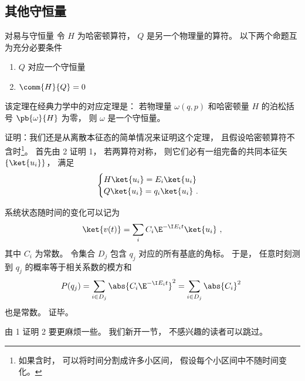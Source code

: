 \subsection{其他守恒量}


\begin{theorem}{对易与守恒量}
令 $H$ 为哈密顿算符， $Q$ 是另一个物理量的算符。 以下两个命题互为充分必要条件
\begin{enumerate}
\item $Q$ 对应一个守恒量
\item $\comm{H}{Q} = 0$
\end{enumerate}
\end{theorem}

该定理在经典力学中的对应定理是： 若物理量 $\omega(q, p)$ 和哈密顿量 $H$ 的泊松括号 $\pb{\omega}{H}$ 为零， 则 $\omega$ 是一个守恒量。

证明：我们还是从离散本征态的简单情况来证明这个定理， 且假设哈密顿算符不含时\footnote{如果含时， 可以将时间分割成许多小区间， 假设每个小区间中不随时间变化。}。 首先由 2 证明 1， 若两算符对称， 则它们必有一组完备的共同本征矢 $\{\ket{u_i}\}$， 满足
\begin{equation}
\begin{cases}
H \ket{u_i} = E_i \ket{u_i}\\
Q \ket{u_i} = q_i \ket{u_i}~.
\end{cases}
\end{equation}

系统状态随时间的变化可以记为
\begin{equation}
\ket{v(t)} = \sum_i C_i \E^{-\I E_i t} \ket{u_i}~,
\end{equation}
其中 $C_i$ 为常数。 令集合 $D_j$ 包含 $q_j$ 对应的所有基底的角标。 于是， 任意时刻测到 $q_j$ 的概率等于相关系数的模方和
\begin{equation}
P(q_j) = \sum_{i \in D_j} \abs{C_i \E^{-\I E_i t}}^2 = \sum_{i \in D_j} \abs{C_i}^2~
\end{equation}
也是常数。 证毕。

由 1 证明 2 要更麻烦一些。 我们新开一节， 不感兴趣的读者可以跳过。

